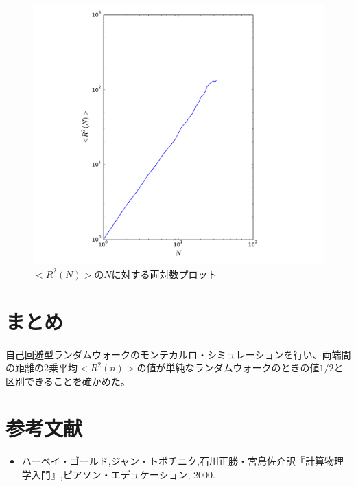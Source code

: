 \documentclass{jsarticle}
\begin{document}
\begin{enumerate}
\begin{enumerate}
\begin{table}[H]
\begin{center}
\begin{tabular}{c|c}
                            \end{tabular}
                            \label{tab:1}
                        \end{center}
                    \end{table}
                    
                    \begin{figure}[H]
                        \begin{center}
                            \includegraphics[width=12.5cm]{figure_2.pdf}
                            \caption{$<R^{2}(N)>$の$N$に対する両対数プロット}
                            \label{fig:12-12-f2}
                        \end{center}
                    \end{figure}
                    
                    
                \end{enumerate} 

                
        \end{enumerate}
    
    \section{まとめ}
        
    自己回避型ランダムウォークのモンテカルロ・シミュレーションを行い、両端間の距離の2乗平均$<R^{2}(n)>$の値が単純なランダムウォークのときの値$1/2$と区別できることを確かめた。
    
    \section{参考文献}
    
        \begin{itemize}
            \item ハーベイ・ゴールド,ジャン・トボチニク,石川正勝・宮島佐介訳『計算物理学入門』,ピアソン・エデュケーション, 2000.
        \end{itemize}
\end{document}

